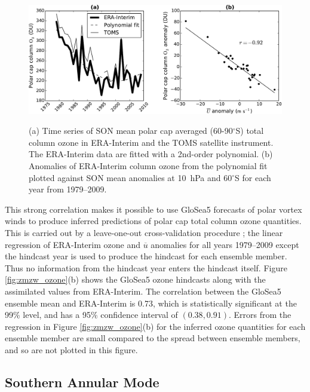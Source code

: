 \begin{figure}[t]
  \noindent\includegraphics[width=\textwidth,angle=0]{figures/chapter-seasonal/zmzw_ozone_scatter_crop.pdf}\\
  \caption[Relation between stratospheric polar vortex strenth and column
  ozone.]{(a) Time series of SON mean polar cap averaged (60-90$^{\circ}$S)
    total column ozone in ERA-Interim and the TOMS satellite instrument. The
    ERA-Interim data are fitted with a 2nd-order polynomial. (b) Anomalies of
    ERA-Interim column ozone from the polynomial fit plotted against SON mean
    anomalies at 10~hPa and 60$^{\circ}$S for each year from
    1979--2009.} \label{fig:zmzw_scatter}
\end{figure}

This strong correlation makes it possible to use GloSea5 forecasts of polar
vortex winds to produce inferred predictions of polar cap total column ozone
quantities. This is carried out by a leave-one-out cross-validation procedure
\citep{Wilks}; the linear regression of ERA-Interim ozone and $\overline{u}$
anomalies for all years 1979--2009 except the hindcast year is used to produce
the hindcast for each ensemble member. Thus no information from the hindcast
year enters the hindcast itself. Figure \ref{fig:zmzw_ozone}(b) shows the
GloSea5 ozone hindcasts along with the assimilated values from ERA-Interim. The
correlation between the GloSea5 ensemble mean and ERA-Interim is 0.73, which is
statistically significant at the 99\% level, and has a 95\% confidence interval
of $(0.38,0.91)$. Errors from the regression in Figure \ref{fig:zmzw_ozone}(b)
for the inferred ozone quantities for each ensemble member are small compared to
the spread between ensemble members, and so are not plotted in this figure.

\subsection{Southern Annular Mode}

